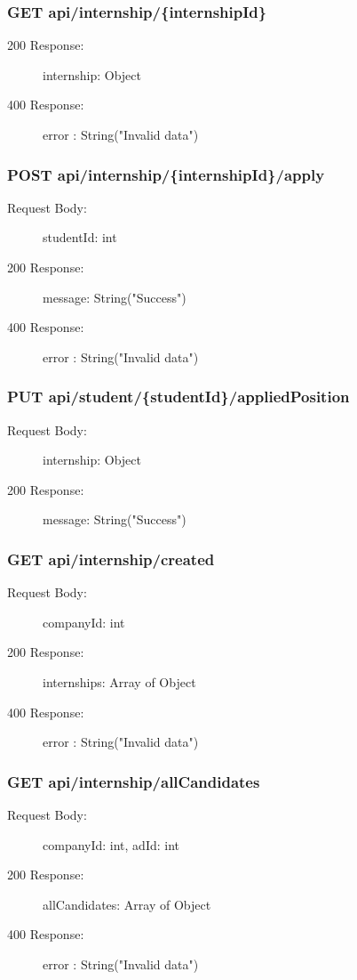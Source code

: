\documentclass[a4paper,12pt]{article}
\begin{document}
\subsubsection*{GET api/internship/\{internshipId\}}
\begin{description}
    \item[200 Response:] internship: Object
    \item[400 Response:] error : String("Invalid data")
\end{description}

\subsubsection*{POST api/internship/\{internshipId\}/apply}
\begin{description}
    \item[Request Body:] studentId: int
    \item[200 Response:] message: String("Success")
    \item[400 Response:] error : String("Invalid data")
\end{description}

\subsubsection*{PUT api/student/\{studentId\}/appliedPosition}
\begin{description}
    \item[Request Body:] internship: Object
    \item[200 Response:] message: String("Success")
\end{description}

\subsubsection*{GET api/internship/created}
\begin{description}
    \item[Request Body:]  companyId: int
    \item[200 Response:] internships: Array of Object
    \item[400 Response:] error : String("Invalid data")
\end{description}

\subsubsection*{GET api/internship/allCandidates}
\begin{description}
    \item[Request Body:]  companyId: int, adId: int
    \item[200 Response:] allCandidates: Array of Object
    \item[400 Response:] error : String("Invalid data")
\end{description}
\end{document}
